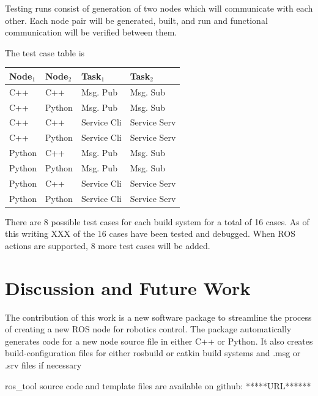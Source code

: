 \documentclass[letterpaper, 10 pt, conference]{ieeeconf}  %
\begin{document}
Testing runs consist of generation of two nodes which will communicate with each other.  Each node pair will be generated, built, and run and functional communication will be verified between them.

The test case table is
\vspace{0.15in}

\begin{tabular}{|l|l|l|l|}\hline
Node$_1$      & Node$_2$      & Task$_1$ & Task$_2$ \\\hline
C++           & C++           & Msg. Pub & Msg. Sub \\\hline
C++           & Python        & Msg. Pub & Msg. Sub \\\hline
C++           & C++           & Service Cli & Service Serv \\\hline
C++           & Python        & Service Cli & Service Serv \\\hline
Python        & C++           & Msg. Pub & Msg. Sub \\\hline
Python        & Python        & Msg. Pub & Msg. Sub \\\hline
Python        & C++           & Service Cli & Service Serv \\\hline
Python        & Python        & Service Cli & Service Serv \\\hline
\end{tabular}

\vspace{0.15in}

There are 8 possible test cases for each build system for a total of 16 cases.  As of this writing XXX of the 16 cases have been tested and debugged.  When ROS actions are supported, 8 more test cases will be added.




\section{Discussion and Future Work}
The contribution of this work is a new software package to streamline the
process of creating a new ROS node for robotics control.
The package automatically generates
code for a new node source file in either C++ or Python.  It also creates
build-configuration files for either rosbuild or catkin build systems and
.msg or .srv files if necessary

ros\_tool source code and template files are available on github: *****URL******
\end{document}
